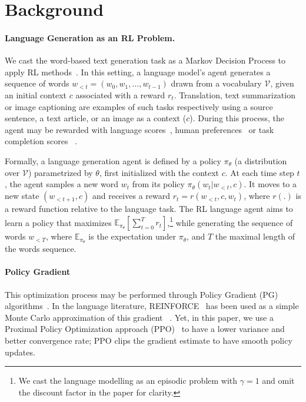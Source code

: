 \documentclass{article}
\newcommand{\Voc}{\mathcal{V}}
\newcommand{\params}{\theta}
\newcommand{\policy}{\pi_{\params}}
\begin{document}
\section{Background}
\label{sec:background}
\paragraph{Language Generation as an RL Problem.}
We cast the word-based text generation task as a Markov Decision Process to apply RL methods~\cite{sutton1998introduction}. In this setting, a language model's agent generates a sequence of words $w_{<t} = (w_0, w_1, \dots, w_{t-1})$ drawn from a vocabulary $\Voc$, given an initial context $c$ associated with a reward $r_t$. 
Translation, text summarization or image captioning are examples of such tasks respectively using a source sentence, a text article, or an image as a context ($c$). 
During this process, the agent may be rewarded with language scores~\citep{ranzato2015sequence}, human preferences~\citep{stiennon2020learning} or task completion scores ~\citep{strub2017end}.


Formally, a language generation agent is defined by a policy $\policy$ (a distribution over $\Voc$) parametrized by $\params$, first initialized with the context $c$. At each time step $t$, the agent samples a new word $w_t$ from its policy $\policy(w_t|w_{<t}, c)$. It moves to a new state $(w_{<t+1}, c)$ and receives a reward $r_t=r(w_{<{t}}, c, w_{t})$, where $r(.)$ is a reward function relative to the language task. The RL language agent aims to learn a policy that maximizes  $\mathbb{E}_{\policy}[\sum^T_{t=0} r_t]$,\footnote{We cast the language modelling as an episodic problem with $\gamma=1$ and omit the discount factor in the paper for clarity.} while generating the sequence of words $w_{<T}$, where $\mathbb{E}_{\policy}$ is the expectation under $\policy$, and $T$ the maximal length of the words sequence.


\paragraph{Policy Gradient} This optimization process may be performed through Policy Gradient (PG) algorithms~\citep{sutton1999policy}. 
In the language literature, REINFORCE~\citep{williams1992simple} has been used as a simple Monte Carlo approximation of this gradient ~\citep{strub2017end,li2016deep}.
Yet, in this paper, we use a Proximal Policy Optimization approach (PPO)~\citep{schulman2017proximal} to have a lower variance and better convergence rate; PPO clips the gradient estimate to have smooth policy updates.
\end{document}

